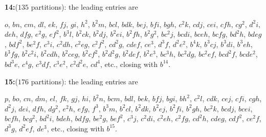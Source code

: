 \documentclass[11pt,a4paper]{article}
\begin{document}
\newpage
{\sloppy
\noindent\textbf{14:}\quad ($135$ partitions): the leading entries are\par\noindent
$o$, $bn$, $cm$, $dl$, $ek$, $fj$, $gi$, $h^{2}$, $b^{2}m$, $bcl$, $bdk$, $bej$, $bfi$, $bgh$, $c^{2}k$, $cdj$, $cei$, $cfh$, $cg^{2}$, $d^{2}i$, $deh$, $dfg$, $e^{2}g$, $ef^{2}$, $b^{3}l$, $b^{2}ck$, $b^{2}dj$, $b^{2}ei$, $b^{2}fh$, $b^{2}g^{2}$, $bc^{2}j$, $bcdi$, $bceh$, $bcfg$, $bd^{2}h$, $bdeg$, $bdf^{2}$, $be^{2}f$, $c^{3}i$, $c^{2}dh$, $c^{2}eg$, $c^{2}f^{2}$, $cd^{2}g$, $cdef$, $ce^{3}$, $d^{3}f$, $d^{2}e^{2}$, $b^{4}k$, $b^{3}cj$, $b^{3}di$, $b^{3}eh$, $b^{3}fg$, $b^{2}c^{2}i$, $b^{2}cdh$, $b^{2}ceg$, $b^{2}cf^{2}$, $b^{2}d^{2}g$, $b^{2}def$, $b^{2}e^{3}$, $bc^{3}h$, $bc^{2}dg$, $bc^{2}ef$, $bcd^{2}f$, $bcde^{2}$, $bd^{3}e$, $c^{4}g$, $c^{3}df$, $c^{3}e^{2}$, $c^{2}d^{2}e$, $cd^{4}$, etc., closing with $b^{14}$.
\par}

\newpage
{\sloppy
\noindent\textbf{15:}\quad ($176$ partitions): the leading entries are\par\noindent
$p$, $bo$, $cn$, $dm$, $el$, $fk$, $gj$, $hi$, $b^{2}n$, $bcm$, $bdl$, $bek$, $bfj$, $bgi$, $bh^{2}$, $c^{2}l$, $cdk$, $cej$, $cfi$, $cgh$, $d^{2}j$, $dei$, $dfh$, $dg^{2}$, $e^{2}h$, $efg$, $f^{3}$, $b^{3}m$, $b^{2}cl$, $b^{2}dk$, $b^{2}ej$, $b^{2}fi$, $b^{2}gh$, $bc^{2}k$, $bcdj$, $bcei$, $bcfh$, $bcg^{2}$, $bd^{2}i$, $bdeh$, $bdfg$, $be^{2}g$, $bef^{2}$, $c^{3}j$, $c^{2}di$, $c^{2}eh$, $c^{2}fg$, $cd^{2}h$, $cdeg$, $cdf^{2}$, $ce^{2}f$, $d^{3}g$, $d^{2}ef$, $de^{3}$, etc., closing with $b^{15}$.
\par}
\end{document}
